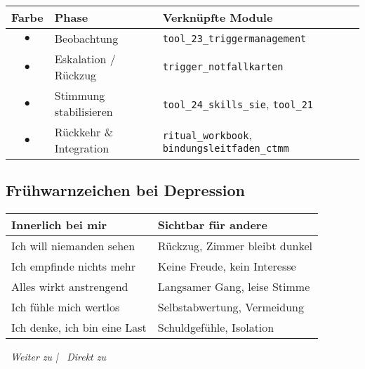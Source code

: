 \begin{tabular}{|c|l|l|}
\hline
\textbf{Farbe} & \textbf{Phase} & \textbf{Verknüpfte Module} \\
\hline
\textcolor{ctmmBlue}{$\bullet$} & Beobachtung & \texttt{tool\_23\_triggermanagement} \\
\textcolor{ctmmRed}{$\bullet$} & Eskalation / Rückzug & \texttt{trigger\_notfallkarten} \\
\textcolor{ctmmOrange}{$\bullet$} & Stimmung stabilisieren & \texttt{tool\_24\_skills\_sie}, \texttt{tool\_21} \\
\textcolor{ctmmPurple}{$\bullet$} & Rückkehr \& Integration & \texttt{ritual\_workbook}, \texttt{bindungsleitfaden\_ctmm} \\
\hline
\end{tabular}

\subsection*{\textcolor{ctmmBlue}{Frühwarnzeichen bei Depression}}

\begin{tabular}{|p{7cm}|p{7cm}|}
\hline
\textbf{Innerlich bei mir} & \textbf{Sichtbar für andere} \\
\hline
Ich will niemanden sehen & Rückzug, Zimmer bleibt dunkel \\
Ich empfinde nichts mehr & Keine Freude, kein Interesse \\
Alles wirkt anstrengend & Langsamer Gang, leise Stimme \\
Ich fühle mich wertlos & Selbstabwertung, Vermeidung \\
Ich denke, ich bin eine Last & Schuldgefühle, Isolation \\
\hline
\end{tabular}

\vspace{1cm}
\begin{center}
\textit{\textcolor{ctmmGreen}{\faChevronRight~Weiter zu}  | \textcolor{ctmmRed}{\faHeart~Direkt zu} }
\end{center}

